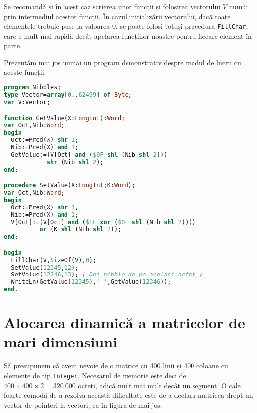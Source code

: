 Se recomandă și în acest caz scrierea unor funcții și folosirea vectorului $V$
numai prin intermediul acestor funcții. În cazul inițializării vectorului,
dacă toate elementele trebuie puse la valoarea 0, se poate folosi totuși
procedura {\tt FillChar}, care e mult mai rapidă decât apelarea funcțiilor
noastre pentru fiecare element în parte.

Prezentăm mai jos numai un program demonstrativ despre modul de lucru cu
aceste funcții:

\begin{lstlisting}[language=Pascal]
program Nibbles;
type Vector=array[0..62499] of Byte;
var V:Vector;

function GetValue(X:LongInt):Word;
var Oct,Nib:Word;
begin
  Oct:=Pred(X) shr 1;
  Nib:=Pred(X) and 1;
  GetValue:=(V[Oct] and ($0F shl (Nib shl 2)))
            shr (Nib shl 2);
end;

procedure SetValue(X:LongInt;K:Word);
var Oct,Nib:Word;
begin
  Oct:=Pred(X) shr 1;
  Nib:=Pred(X) and 1;
  V[Oct]:=(V[Oct] and ($FF xor ($0F shl (Nib shl 2))))
          or (K shl (Nib shl 2));
end;

begin
  FillChar(V,SizeOf(V),0);
  SetValue(12345,12);
  SetValue(12346,13); { Doi nibble de pe acelasi octet }
  WriteLn(GetValue(12345),' ',GetValue(12346));
end.
\end{lstlisting}

\section{Alocarea dinamică a matricelor de mari dimensiuni}

Să presupunem că avem nevoie de o matrice cu 400 linii și 400 coloane cu
elemente de tip {\tt Integer}. Necesarul de memorie este deci de $400 \times
400 \times 2 = 320.000$ octeți, adică mult mai mult decât un segment. O cale
foarte comodă de a rezolva această dificultate este de a declara matricea
drept un vector de pointeri la vectori, ca în figura de mai jos:


